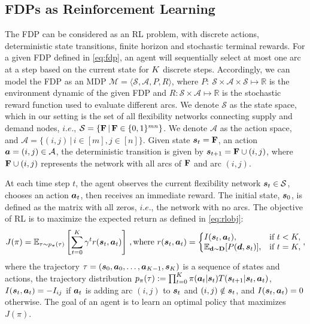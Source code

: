 \documentclass{article} %
\newcommand{\yehua}[1]{{\color{blue}{\bf\sf #1}}}
\begin{document}
\subsection{FDPs as Reinforcement Learning}\label{sec:MDP}
The FDP can be considered as an RL problem, with discrete actions, deterministic state transitions, finite horizon and stochastic terminal rewards. 
For a given FDP defined in \eqref{eq:fdp},  an agent will sequentially select at most one arc at a step based on the current state for $K$ discrete steps.
Accordingly, we can model the FDP as an MDP $\mathcal{M} = \langle\mathcal{S}, \mathcal{A}, P, R \rangle$, where ${P}:~\mathcal{S}\times\mathcal{A}\times\mathcal{S}\mapsto \mathbb{R}$ is the environment dynamic of the given FDP and $R: \mathcal{S}\times\mathcal{A}\mapsto \mathbb{R}$ is the stochastic reward function used to evaluate different arcs.
%
%
%
%
We denote $\mathcal{S}$ as the state space, which in our setting is the set of all flexibility networks connecting supply and demand nodes, $i.e.$, $\mathcal{S} = \{\mathbf{F} \,|\, \mathbf{F} \in \{0,1\}^{mn} \}$. 
We denote $\mathcal{A}$ as the action space, and  $\mathcal{A}=\{(i,j) \,|\, i\in[m], j\in[n] \}$.  Given state ${\boldsymbol s}_t = \mathbf{F}$, an action ${\boldsymbol a} = (i,j)\in\mathcal{A}$, the deterministic transition is given by ${\boldsymbol s}_{t+1} = \mathbf{F} \cup (i,j)$, where $\mathbf{F} \cup (i,j)$ represents the network with all arcs of $\mathbf{F}$ and arc $(i,j)$.

At each time step $t$, the agent observes the current flexibility network ${\boldsymbol s}_t \in \mathcal{S}$, chooses an action ${\boldsymbol a}_t$, then receives an immediate reward. The initial state, ${\boldsymbol s}_0$, is defined as the matrix with all zeros, $i.e.$, the network with no arcs. The objective of RL is to maximize the expected return as defined in \eqref{eq:rlobj}:
\begin{equation}
\begin{aligned}\label{eq:rlobj}
J(\pi) = \mathbb{E}_{\tau\sim p_\pi (\tau)}\left[\sum_{t=0}^K \gamma^t r(\sv_t, \av_t)\right]\,,\text{where}~r(\sv_t, \av_t) = \left\{
   \begin{array}{@{}ll@{}}
     I(\sv_t, \av_t), &\text{if}\ t<\K, \\
     \Ex_{\mathbf{d}\sim \mathbf{D}}[P(\bd, \sv_t)], &\text{if}\ t=\K,
   \end{array}\right.,
\end{aligned}
\end{equation}
where the trajectory $\tau=({\boldsymbol s}_0, {\boldsymbol a}_0,\ldots,{\boldsymbol a}_{K-1}, {\boldsymbol s}_K)$ 
is a sequence of states and actions, the trajectory distribution $p_\pi(\tau):=\prod_{t=0}^K \pi({\boldsymbol a}_t|{\boldsymbol s}_t)T({\boldsymbol s}_{t+1}|{\boldsymbol s}_t, {\boldsymbol a}_t)$, $I({\boldsymbol s}_t, {\boldsymbol a}_t) = -I_{ij}$ if ${\boldsymbol a}_t$ is adding arc $(i,j)$ to ${\boldsymbol s}_t$ and $(i,j)\notin {\boldsymbol s}_t$, and $I({\boldsymbol s}_t, {\boldsymbol a}_t) =0$ otherwise. The goal of an agent is to learn an optimal policy that maximizes $J(\pi)$. 
\end{document}

